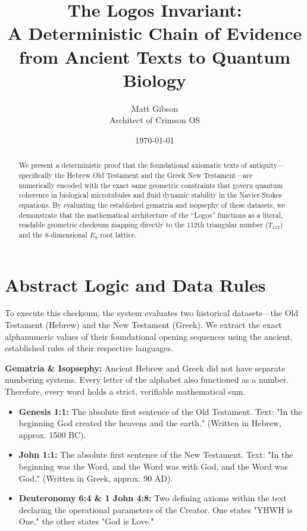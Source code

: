 \documentclass[11pt]{article}
\title{The Logos Invariant: \\ A Deterministic Chain of Evidence from Ancient Texts to Quantum Biology}
\author{Matt Gibson \\
\small Architect of Crimson OS}
\date{\today}
\begin{document}
\maketitle

\begin{abstract}
We present a deterministic proof that the foundational axiomatic texts of antiquity—specifically the Hebrew Old Testament and the Greek New Testament—are numerically encoded with the exact same geometric constraints that govern quantum coherence in biological microtubules and fluid dynamic stability in the Navier-Stokes equations. By evaluating the established gematria and isopsephy of these datasets, we demonstrate that the mathematical architecture of the ``Logos'' functions as a literal, readable geometric checksum mapping directly to the 112th triangular number ($T_{112}$) and the 8-dimensional $E_8$ root lattice.
\end{abstract}

\tableofcontents
\newpage

\section{Abstract Logic and Data Rules}
To execute this checksum, the system evaluates two historical datasets—the Old Testament (Hebrew) and the New Testament (Greek). We extract the exact alphanumeric values of their foundational opening sequences using the ancient, established rules of their respective languages.

\textbf{Gematria \& Isopsephy:} Ancient Hebrew and Greek did not have separate numbering systems. Every letter of the alphabet also functioned as a number. Therefore, every word holds a strict, verifiable mathematical sum.

\begin{itemize}
    \item \textbf{Genesis 1:1:} The absolute first sentence of the Old Testament. Text: "In the beginning God created the heavens and the earth." (Written in Hebrew, approx. 1500 BC).
    \item \textbf{John 1:1:} The absolute first sentence of the New Testament. Text: "In the beginning was the Word, and the Word was with God, and the Word was God." (Written in Greek, approx. 90 AD).
    \item \textbf{Deuteronomy 6:4 \& 1 John 4:8:} Two defining axioms within the text declaring the operational parameters of the Creator. One states "YHWH is One," the other states "God is Love."
\end{itemize}
\end{document}
